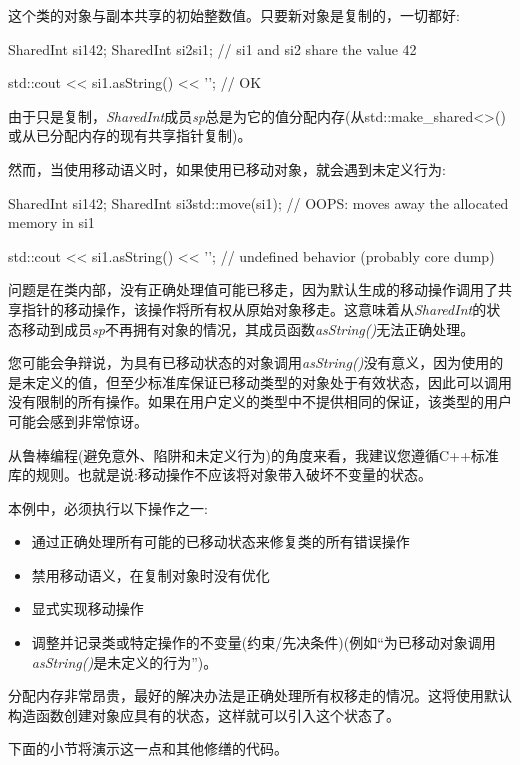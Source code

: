 这个类的对象与副本共享的初始整数值。只要新对象是复制的，一切都好:

\begin{cppcode}
SharedInt si1{42};
SharedInt si2{si1}; // si1 and si2 share the value 42

std::cout << si1.asString() << '\n'; // OK
\end{cppcode}

由于只是复制，\textit{SharedInt}成员\textit{sp}总是为它的值分配内存(从std::make_shared<>()或从已分配内存的现有共享指针复制)。

然而，当使用移动语义时，如果使用已移动对象，就会遇到未定义行为:

\begin{cppcode}
SharedInt si1{42};
SharedInt si3{std::move(si1)}; // OOPS: moves away the allocated memory in si1

std::cout << si1.asString() << '\n'; // undefined behavior (probably core dump)
\end{cppcode}

问题是在类内部，没有正确处理值可能已移走，因为默认生成的移动操作调用了共享指针的移动操作，该操作将所有权从原始对象移走。这意味着从\textit{SharedInt}的状态移动到成员\textit{sp}不再拥有对象的情况，其成员函数\textit{asString()}无法正确处理。

您可能会争辩说，为具有已移动状态的对象调用\textit{asString()}没有意义，因为使用的是未定义的值，但至少标准库保证已移动类型的对象处于有效状态，因此可以调用没有限制的所有操作。如果在用户定义的类型中不提供相同的保证，该类型的用户可能会感到非常惊讶。

从鲁棒编程(避免意外、陷阱和未定义行为)的角度来看，我建议您遵循C++标准库的规则。也就是说:移动操作不应该将对象带入破坏不变量的状态。

本例中，必须执行以下操作之一:

\begin{itemize}
	\item 通过正确处理所有可能的已移动状态来修复类的所有错误操作
	\item 禁用移动语义，在复制对象时没有优化
	\item 显式实现移动操作
	\item 调整并记录类或特定操作的不变量(约束/先决条件)(例如“为已移动对象调用\textit{asString()}是未定义的行为”)。
\end{itemize}

分配内存非常昂贵，最好的解决办法是正确处理所有权移走的情况。这将使用默认构造函数创建对象应具有的状态，这样就可以引入这个状态了。

下面的小节将演示这一点和其他修缮的代码。

